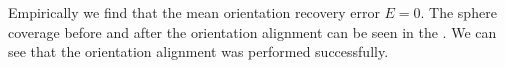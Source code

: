 Empirically we find that the mean orientation recovery error  $E = 0$. The sphere coverage before and after the orientation alignment can be seen in the . We can see that the orientation alignment was performed successfully.
        

